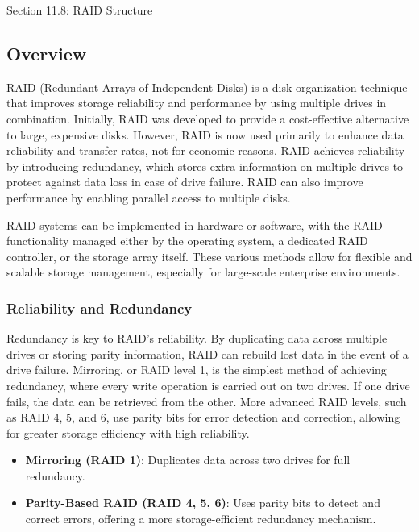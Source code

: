 \begin{notes}{Section 11.8: RAID Structure}

    \subsection*{Overview}
    
    RAID (Redundant Arrays of Independent Disks) is a disk organization technique that improves storage reliability and performance by using multiple drives in combination. Initially, RAID was developed 
    to provide a cost-effective alternative to large, expensive disks. However, RAID is now used primarily to enhance data reliability and transfer rates, not for economic reasons. RAID achieves reliability 
    by introducing redundancy, which stores extra information on multiple drives to protect against data loss in case of drive failure. RAID can also improve performance by enabling parallel access to 
    multiple disks.

    RAID systems can be implemented in hardware or software, with the RAID functionality managed either by the operating system, a dedicated RAID controller, or the storage array itself. These various 
    methods allow for flexible and scalable storage management, especially for large-scale enterprise environments.

    \subsubsection*{Reliability and Redundancy}
    
    Redundancy is key to RAID’s reliability. By duplicating data across multiple drives or storing parity information, RAID can rebuild lost data in the event of a drive failure. Mirroring, or RAID level 1, 
    is the simplest method of achieving redundancy, where every write operation is carried out on two drives. If one drive fails, the data can be retrieved from the other. More advanced RAID levels, such 
    as RAID 4, 5, and 6, use parity bits for error detection and correction, allowing for greater storage efficiency with high reliability.

    \begin{highlight}
    
        \begin{itemize}
            \item \textbf{Mirroring (RAID 1)}: Duplicates data across two drives for full redundancy.
            \item \textbf{Parity-Based RAID (RAID 4, 5, 6)}: Uses parity bits to detect and correct errors, offering a more storage-efficient redundancy mechanism.
        \end{itemize}
    

\end{highlight}
\end{notes}
